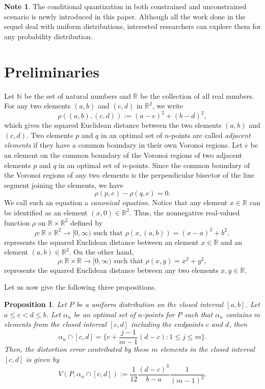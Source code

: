 \documentclass[12pt, reqno]{amsart}
\theoremstyle{plain}
\newtheorem{prop}[subsection]{Proposition}
\theoremstyle{definition}
\newtheorem{note}[subsection]{Note}
\newcommand{\ii}{\cap}%
\newcommand{\set}[1]{\{#1\}}%
\newcommand{\ga}{\alpha}
\newcommand{\tit}{\textit}%
\newcommand{\D}[1]{\mathbb{#1}}%
\newcommand{\te}{\text}%
\begin{document}
\begin{note}
The conditional quantization in both constrained and unconstrained scenario is newly introduced in this paper. Although all the work done in the sequel deal with uniform distributions, interested researchers can explore them for any probability distribution. 
 \end{note}

\section{Preliminaries} \label{secPre}

Let $\mathbb{N}$ be the set of natural numbers and $\mathbb{R}$ be the collection of all real numbers.
For any two elements $(a, b)$ and $(c, d)$ in $\D R^2$, we write 
 \[\rho((a, b), (c, d)):=(a-c)^2 +(b-d)^2,\] which gives the squared Euclidean distance between the two elements $(a, b)$ and $(c, d)$.
  Two elements $p$ and $q$ in an optimal set of $n$-points are called \tit{adjacent elements} if they have a common boundary in their own Voronoi regions. Let $e$ be an element on the common boundary of the Voronoi regions of two adjacent elements $p$ and $q$ in an optimal set of $n$-points. Since the common boundary of the Voronoi regions of any two elements is the perpendicular bisector of the line segment joining the elements, we have
\[\rho(p, e)-\rho(q, e)=0. \]
We call such an equation a \tit{canonical equation}. 
Notice that any element $x\in \D R$ can be identified as an element $(x, 0)\in \D R^2$. Thus, the nonnegative real-valued function $\rho$ on $\D R \times \D R^2$ defined by 
\[\rho: \D R \times \D R^2 \to [0, \infty) \te{ such that } \rho(x, (a, b))=(x-a)^2 +b^2,\]
represents the squared Euclidean distance between an element $x\in \D R$ and an element $(a, b)\in \D R^2$. On the other hand, 
\[\rho: \D R \times \D R  \to [0, \infty) \te{ such that } \rho(x, y)=x^2+y^2,\]
represents the squared Euclidean distance between any two elements $x, y \in \D R$.

Let us now give the following three propositions. 
\begin{prop} \label{Me0} 
Let $P$ be a uniform distribution on the closed interval $[a, b]$. Let $a\leq c<d\leq b$. Let $\ga_n$ be an optimal set of $n$-points for $P$ such that $\ga_n$ contains $m$ elements from the closed interval $[c, d]$ including the endpoints $c$ and $d$, then
\[\ga_n\ii[c, d]=\set{c+\frac{j-1}{m-1}(d-c) : 1\leq j\leq m}.\] 
Then, the distortion error contributed by these $m$ elements in the closed interval  $[c, d]$ is given by 
 \[V(P, \ga_n\ii [c, d]):=\frac 1 {12}\frac{(d-c)^3}{b-a}\frac 1{ (m-1)^2}.\]
\end{prop} 
  
\end{document}
